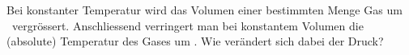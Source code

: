 Bei konstanter Temperatur wird das Volumen einer bestimmten Menge Gas um \dVrO\ vergrössert. Anschliessend verringert man bei konstantem Volumen die (absolute) Temperatur des Gases um \dTrO. Wie verändert sich dabei der Druck?

